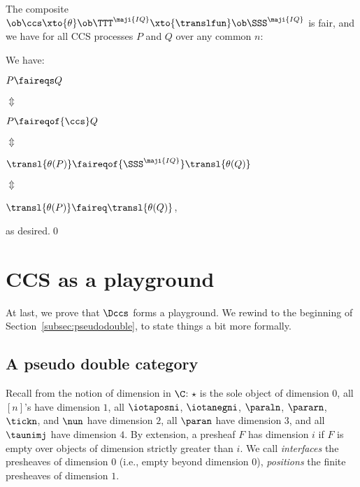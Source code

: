 \documentclass{LMCS}
\renewcommand{\QFI}{\maji{IQ}}
\renewcommand{\LLL}{\QFI}
\renewcommand{\SSSL}{\SSS^{\LLL}}
\renewcommand{\TTTL}{\TTT^{\LLL}}
\theoremstyle{plain}\newtheorem{satz}[thm]{Satz}
\begin{document}
\begin{cor}\label{cor:final}
  The composite $\ob\ccs \xto{\theta} \ob\TTTL \xto{\translfun}
  \ob\SSSL$ is fair, and we have for all CCS processes $P$ and $Q$
  over any common $n$:
\end{cor}
\proof
We have:
\begin{center}
\hspace*{-10em}  \begin{minipage}[t]{.8\linewidth}
\centering

    $P \faireqs Q$

    $\Updownarrow$

    $P \faireqof{\ccs} Q$







    $\Updownarrow$

    $\transl{\theta(P)} \faireqof{\SSSL} \transl{\theta(Q)}$
    
    $\Updownarrow$

    $\transl{\theta(P)} \faireq \transl{\theta(Q)}$,
  \end{minipage}
\end{center}
as desired.\qed



\section{CCS as a playground}\label{sec:ccs}
At last, we prove that $\Dccs$ forms a playground. We rewind to the
beginning of Section~\ref{subsec:pseudodouble}, to state things a bit
more formally.

\subsection{A pseudo double category}
Recall from  the notion of dimension
in $\C$: $\star$ is the sole object of dimension $0$, all $[n]$'s have
dimension $1$, all $\iotaposni$, $\iotanegni$, $\paraln$, $\pararn$,
$\tickn$, and $\nun$ have dimension $2$, all $\paran$ have dimension
3, and all $\taunimj$ have dimension $4$.  By extension, a presheaf
$F$ has dimension $i$ if $F$ is empty over objects of dimension
strictly greater than $i$.  We call \emph{interfaces} the presheaves
of dimension $0$ (i.e., empty beyond dimension $0$), \emph{positions}
the finite presheaves of dimension $1$.
\end{document}
